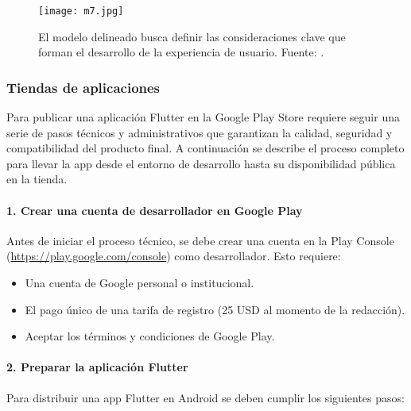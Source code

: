\begin{figure}[h!]
\centering
  \texttt{[image: m7.jpg]}
  \caption{El modelo delineado busca definir las consideraciones clave que forman el desarrollo de la experiencia de usuario. Fuente: \cite{garrett2011elements}.}
  \label{m7}
\end{figure}

\newpage
\subsubsection*{Tiendas de aplicaciones}
Para publicar una aplicación Flutter en la Google Play Store requiere seguir una serie de pasos técnicos y administrativos que garantizan la calidad, seguridad y compatibilidad del producto final. A continuación se describe el proceso completo para llevar la app desde el entorno de desarrollo hasta su disponibilidad pública en la tienda.

\paragraph{1. Crear una cuenta de desarrollador en Google Play}

Antes de iniciar el proceso técnico, se debe crear una cuenta en la Play Console (\url{https://play.google.com/console}) como desarrollador. Esto requiere:

\begin{itemize}
    \item Una cuenta de Google personal o institucional.
    \item El pago único de una tarifa de registro (25 USD al momento de la redacción).
    \item Aceptar los términos y condiciones de Google Play.
\end{itemize}

\paragraph{2. Preparar la aplicación Flutter}

Para distribuir una app Flutter en Android se deben cumplir los siguientes pasos:


